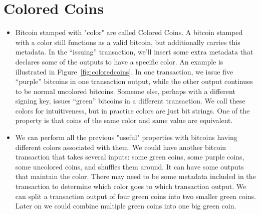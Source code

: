 \documentclass[10pt,a4paper]{article}
\begin{document}
\section{Colored Coins}
\begin{itemize}
\item Bitcoin stamped with "color" are called Colored Coins. A bitcoin stamped with a color still functions as a valid bitcoin, but additionally carries this metadata. In the “issuing” transaction, we’ll insert some extra metadata that declares some of the outputs to have a specific color. An example is illustrated in Figure~\ref{fig:coloredcoins}. In one transaction, we issue five “purple” bitcoins in one transaction output, while the other output continues to be normal uncolored bitcoins. Someone else, perhaps with a different signing key, issues “green” bitcoins in a different transaction. We call these colors for intuitiveness, but in practice colors are just bit strings. One of the property is that coins of the same color and same value are equivalent.
\item We can perform all the previous "useful" properties with bitcoins having different colors associated with them. We could have another bitcoin transaction that takes several inputs: some green coins, some purple coins, some uncolored coins, and shuffles them around. It can have some outputs that maintain the color. There may need to be some metadata included in the transaction to determine which color goes to which transaction output. We can split a transaction output of four green coins into two smaller green coins. Later on we could combine multiple green coins into one big green coin.
\end{itemize}
\end{document}
